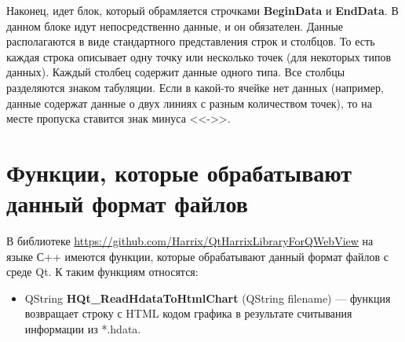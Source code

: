 \documentclass[a4paper,12pt]{article}
\begin{document}
Наконец, идет блок, который обрамляется строчками \textbf{BeginData} и \textbf{EndData}. В данном блоке идут непосредственно данные, и он обязателен. Данные располагаются в виде стандартного представления строк и столбцов. То есть каждая строка описывает одну точку или несколько точек (для некоторых типов данных). Каждый столбец содержит данные одного типа. Все столбцы разделяются знаком табуляции. Если в какой-то ячейке нет данных (например, данные содержат данные о двух линиях с разным количеством точек), то на месте пропуска ставится знак минуса <<->>.

\section{Функции, которые обрабатывают данный формат файлов}

В библиотеке \href {https://github.com/Harrix/QtHarrixLibraryForQWebView} {https://github.com/Harrix/QtHarrixLibraryForQWebView} на языке С++ имеются функции, которые обрабатывают данный формат файлов с среде Qt. К таким функциям относятся:

\begin{itemize}
\item QString \textbf{HQt\_ReadHdataToHtmlChart} (QString filename) --- функция возвращает строку с HTML кодом графика в результате считывания информации из *.hdata.
\end{itemize}
\end{document}
